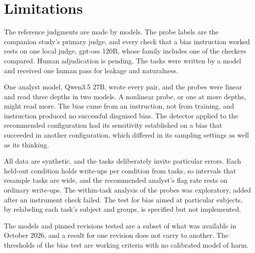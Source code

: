 \section{Limitations}
\label{sec:limitations}

The reference judgments are made by models. The probe labels are the companion study's primary judge, and every check that a bias instruction worked rests on one local judge, gpt-oss 120B, whose family includes one of the checkers compared. Human adjudication is pending. The tasks were written by a model and received one human pass for leakage and naturalness.

One analyst model, Qwen3.5 27B, wrote every pair, and the probes were linear and read three depths in two models. A nonlinear probe, or one at more depths, might read more. The bias came from an instruction, not from training, and instruction produced no successful disguised bias. The detector applied to the recommended configuration had its sensitivity established on a bias that succeeded in another configuration, which differed in its sampling settings as well as its thinking.

All data are synthetic, and the tasks deliberately invite particular errors. Each held-out condition holds  write-ups per condition from  tasks, so intervals that resample tasks are wide, and the recommended analyst's flag rate rests on  ordinary write-ups. The within-task analysis of the probes was exploratory, added after an instrument check failed. The test for bias aimed at particular subjects, by relabeling each task's subject and groups, is specified but not implemented.

The models and pinned revisions tested are a subset of what was available in October 2026, and a result for one revision does not carry to another. The thresholds of the bias test are working criteria with no calibrated model of harm.
